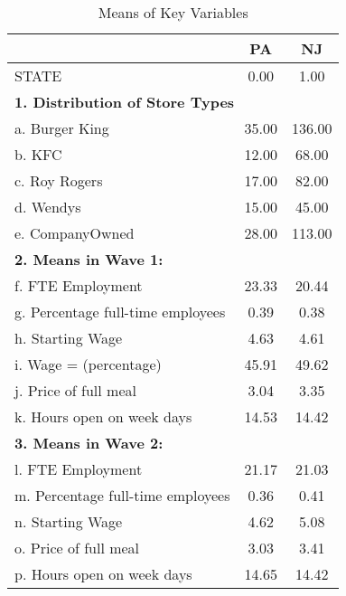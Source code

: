 \documentclass{article}
\begin{document}
\setcounter{table}{1}
\begin{table}[htbp]
\centering
\caption{Means of Key Variables}
\label{tab:means}

\begin{tabular}{lcc}
\toprule
 & PA & NJ \\
\midrule
STATE & 0.00 & 1.00 \\
\midrule
\multicolumn{3}{l}{\textbf{1. Distribution of Store Types}} \\
a. Burger King & 35.00 & 136.00 \\
b. KFC & 12.00 & 68.00 \\
c. Roy Rogers & 17.00 & 82.00 \\
d. Wendys & 15.00 & 45.00 \\
e. CompanyOwned & 28.00 & 113.00 \\
\midrule
\multicolumn{3}{l}{\textbf{2. Means in Wave 1:}} \\
f. FTE Employment & 23.33 & 20.44 \\
g. Percentage full-time employees & 0.39 & 0.38 \\
h. Starting Wage & 4.63 & 4.61 \\
i. Wage = \textdollar 4.25 (percentage) & 45.91 & 49.62 \\
j. Price of full meal & 3.04 & 3.35 \\
k. Hours open on week days & 14.53 & 14.42 \\
\midrule
\multicolumn{3}{l}{\textbf{3. Means in Wave 2:}} \\
l. FTE Employment & 21.17 & 21.03 \\
m. Percentage full-time employees & 0.36 & 0.41 \\
n. Starting Wage & 4.62 & 5.08 \\
o. Price of full meal & 3.03 & 3.41 \\
p. Hours open on week days & 14.65 & 14.42 \\
\bottomrule
\end{tabular}
\end{table}
\end{document}
